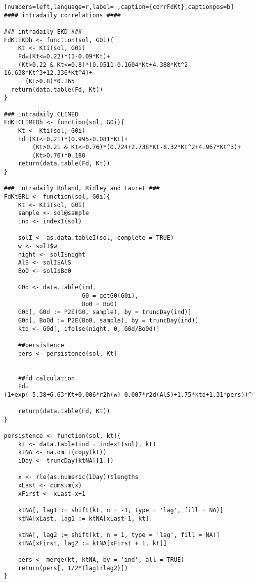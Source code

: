 \begin{lstlisting}[numbers=left,language=r,label= ,caption={corrFdKt},captionpos=b]
#### intradaily correlations ####

### intradaily EKD ###
FdKtEKDh <- function(sol, G0i){
    Kt <- Kti(sol, G0i)
    Fd=(Kt<=0.22)*(1-0.09*Kt)+
    (Kt>0.22 & Kt<=0.8)*(0.9511-0.1604*Kt+4.388*Kt^2-16.638*Kt^3+12.336*Kt^4)+
      (Kt>0.8)*0.165
  return(data.table(Fd, Kt))
}

### intradaily CLIMED
FdKtCLIMEDh <- function(sol, G0i){
    Kt <- Kti(sol, G0i)
    Fd=(Kt<=0.21)*(0.995-0.081*Kt)+
        (Kt>0.21 & Kt<=0.76)*(0.724+2.738*Kt-8.32*Kt^2+4.967*Kt^3)+
        (Kt>0.76)*0.180
    return(data.table(Fd, Kt))
}

### intradaily Boland, Ridley and Lauret ###
FdKtBRL <- function(sol, G0i){
    Kt <- Kti(sol, G0i)
    sample <- sol@sample
    ind <- indexI(sol)

    solI <- as.data.tableI(sol, complete = TRUE)
    w <- solI$w
    night <- solI$night
    AlS <- solI$AlS
    Bo0 <- solI$Bo0

    G0d <- data.table(ind,
                      G0 = getG0(G0i),
                      Bo0 = Bo0)
    G0d[, G0d := P2E(G0, sample), by = truncDay(ind)]
    G0d[, Bo0d := P2E(Bo0, sample), by = truncDay(ind)]
    ktd <- G0d[, ifelse(night, 0, G0d/Bo0d)]

    ##persistence    
    pers <- persistence(sol, Kt)


    ##fd calculation
    Fd=(1+exp(-5.38+6.63*Kt+0.006*r2h(w)-0.007*r2d(AlS)+1.75*ktd+1.31*pers))^(-1)

    return(data.table(Fd, Kt))
}

persistence <- function(sol, kt){
    kt <- data.table(ind = indexI(sol), kt)
    ktNA <- na.omit(copy(kt))
    iDay <- truncDay(ktNA[[1]])

    x <- rle(as.numeric(iDay))$lengths
    xLast <- cumsum(x)
    xFirst <- xLast-x+1

    ktNA[, lag1 := shift(kt, n = -1, type = 'lag', fill = NA)]
    ktNA[xLast, lag1 := ktNA[xLast-1, kt]]

    ktNA[, lag2 := shift(kt, n = 1, type = 'lag', fill = NA)]
    ktNA[xFirst, lag2 := ktNA[xFirst + 1, kt]]

    pers <- merge(kt, ktNA, by = 'ind', all = TRUE)
    return(pers[, 1/2*(lag1+lag2)])
}
\end{lstlisting}
